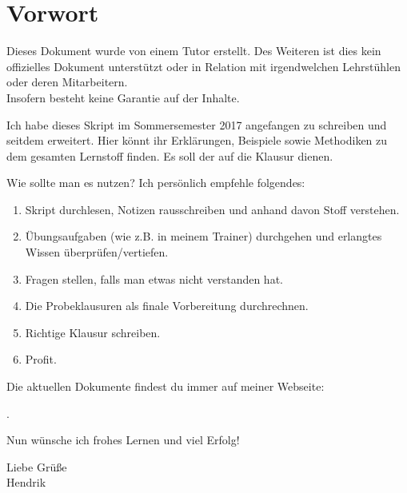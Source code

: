 
	\newpage
	
\section{Vorwort}
	\large
	\vfill
	Dieses Dokument wurde von einem Tutor erstellt. Des Weiteren ist dies kein offizielles Dokument unterstützt oder in Relation mit irgendwelchen Lehrstühlen oder deren Mitarbeitern.
	\\
	Insofern besteht keine Garantie auf  der Inhalte.
	\vfill
	
	\noindent Ich habe dieses Skript im Sommersemester 2017 angefangen zu schreiben und seitdem erweitert. Hier könnt ihr Erklärungen, Beispiele sowie Methodiken zu dem gesamten Lernstoff finden. Es soll der  auf die Klausur dienen.
	\vfill
	
	\noindent Wie sollte man es nutzen? Ich persönlich empfehle folgendes:
	\begin{enumerate}
		\item Skript durchlesen, Notizen rausschreiben und anhand davon Stoff verstehen.
		\item Übungsaufgaben (wie z.B. in meinem Trainer) durchgehen und erlangtes Wissen überprüfen/vertiefen.
		\item Fragen stellen, falls man etwas nicht verstanden hat.
		\item Die Probeklausuren als finale Vorbereitung durchrechnen.
		\item Richtige Klausur schreiben.
		\item Profit. \Cooley
	\end{enumerate}
	\vfill
	
	\noindent Die aktuellen Dokumente findest du immer auf meiner Webseite:
	\begin{center}
		\href{\npauthorurl}{\npauthorurltext}.
	\end{center} 
	\vfill
	
	\noindent Nun wünsche ich frohes Lernen und viel Erfolg! \Smiley
	\vfill
	
	\noindent Liebe Grüße \\
	Hendrik
	
	\vfill
	\vfill
	\normalsize
